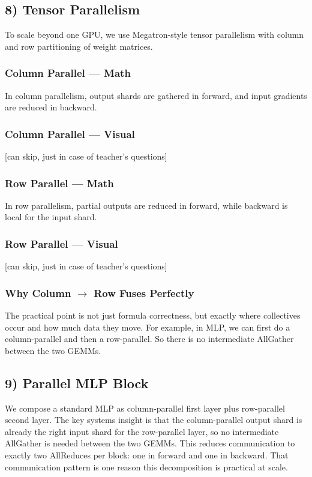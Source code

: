\documentclass[11pt]{article}
\begin{document}
\subsection*{8) Tensor Parallelism}

To scale beyond one GPU, we use Megatron-style tensor parallelism with column and row partitioning of weight matrices.

\subsubsection*{Column Parallel --- Math}

In column parallelism, output shards are gathered in forward, and input gradients are reduced in backward.

\subsubsection*{Column Parallel --- Visual}

[can skip, just in case of teacher's questions]

\subsubsection*{Row Parallel --- Math}

In row parallelism, partial outputs are reduced in forward, while backward is local for the input shard.

\subsubsection*{Row Parallel --- Visual}

[can skip, just in case of teacher's questions]

\subsubsection*{Why Column $\to$ Row Fuses Perfectly}

The practical point is not just formula correctness, but exactly where collectives occur and how much data they move. For example, in MLP, we can first do a column-parallel and then a row-parallel. So there is no intermediate AllGather between the two GEMMs.


\subsection*{9) Parallel MLP Block}
We compose a standard MLP as column-parallel first layer plus row-parallel second layer. The key systems insight is that the column-parallel output shard is already the right input shard for the row-parallel layer, so no intermediate AllGather is needed between the two GEMMs. This reduces communication to exactly two AllReduces per block: one in forward and one in backward. That communication pattern is one reason this decomposition is practical at scale.
\end{document}
